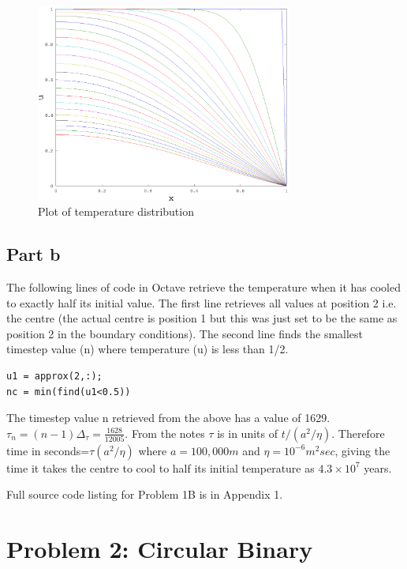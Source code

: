 \documentclass[a4paper,12pt]{article}
\begin{document}
\begin{figure}[H]
\centering
\includegraphics[width=0.75\textwidth]{./problem1_1}
\caption{Plot of temperature distribution}
\label{fig:problem1_1}
\end{figure}

\subsection{Part b}
The following lines of code in Octave retrieve the temperature when it has cooled to exactly half its initial value. The first line retrieves all values at position 2 i.e. the centre (the actual centre is position 1 but this was just set to be the same as position 2 in the boundary conditions). The second line finds the smallest timestep value (n) where temperature (u) is less than 1/2. 
\begin{lstlisting}
u1 = approx(2,:);
nc = min(find(u1<0.5))
\end{lstlisting}
The timestep value n retrieved from the above has a value of 1629. $\tau_n=(n-1)\Delta_{\tau}=\frac{1628}{12005}$. From the notes $\tau$ is in units of $t/\left(a^2/\eta\right)$. Therefore time in seconds=$\tau\left(a^2/\eta\right)$ where $a=100,000m$ and $\eta=10^{-6}m^2 sec$, giving the time it takes the centre to cool to half its initial temperature as $4.3\times 10^7$ years.

Full source code listing for Problem 1B is in Appendix 1.

\newpage
\section{Problem 2: Circular Binary}
\end{document}

